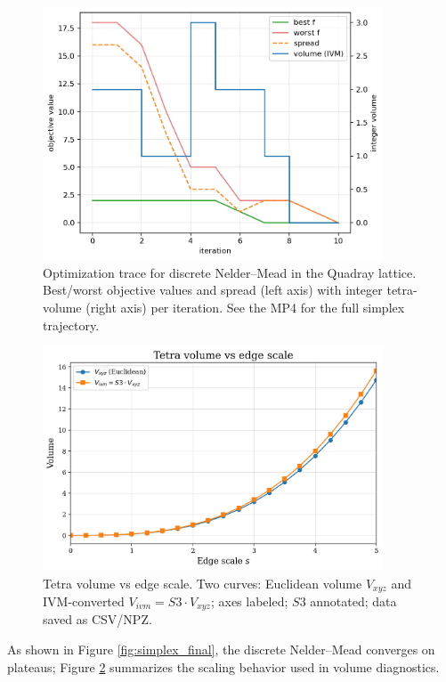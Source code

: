 \documentclass[
  10pt,
]{article}
\begin{document}
\begin{figure}[htbp]
\centering
\includegraphics[width=0.9\textwidth]{figures/simplex_trace.png}
\caption{Optimization trace for discrete Nelder–Mead in the Quadray lattice. Best/worst objective values and spread (left axis) with integer tetra-volume (right axis) per iteration. See the MP4 for the full simplex trajectory.}
\label{fig:simplex_trace}
\end{figure}

\begin{figure}[htbp]
\centering
\includegraphics[width=0.9\textwidth]{figures/volumes_scale_plot.png}
\caption{Tetra volume vs edge scale. Two curves: Euclidean volume $V_{xyz}$ and IVM-converted $V_{ivm}=S3\cdot V_{xyz}$; axes labeled; $S3$ annotated; data saved as CSV/NPZ.}
\label{fig:volumes_scale}
\end{figure}

As shown in Figure \ref{fig:simplex_final}, the discrete Nelder--Mead
converges on plateaus; Figure \ref{fig:volumes_scale} summarizes the
scaling behavior used in volume diagnostics.
\end{document}
